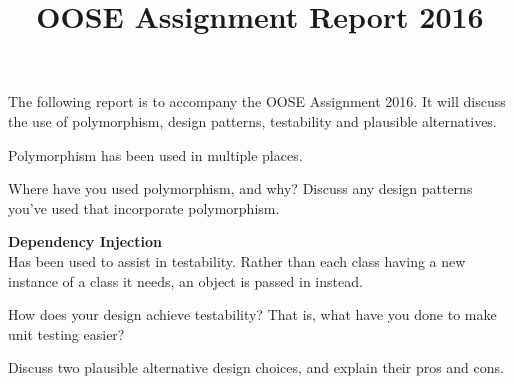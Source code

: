 \documentclass{worksheet}
\title{OOSE Assignment Report 2016}
\begin{document}
	The following report is to accompany the OOSE Assignment 2016. It will discuss the use of polymorphism, design patterns, testability and plausible alternatives. 
     
     
	Polymorphism has been used in multiple places. 
	
	 \begin{note}
	 	Where have you used polymorphism, and why? Discuss any design patterns you’ve used that incorporate polymorphism. 
	 \end{note}
	   

     


\pagebreak     
     
	\textbf{Dependency Injection \\}
	Has been used to assist in testability. Rather than each class having a new instance of a class it needs, an object is passed in instead. 
	 \begin{note}
	 	How does your design achieve testability? That is, what have you done to make unit testing easier?
	 \end{note}



\pagebreak
	
	
	     \begin{note}
	     	Discuss two plausible alternative design choices, and explain their pros and cons.
	     \end{note}
\end{document}
